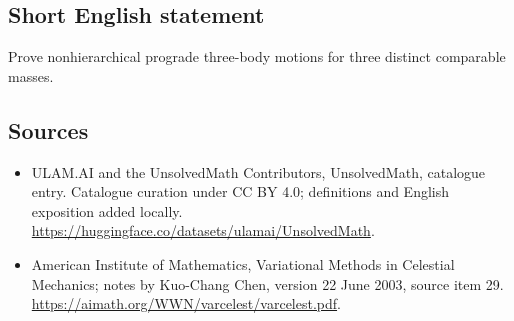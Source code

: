 \documentclass[11pt]{article}
\begin{document}
\subsection{Short English statement}
Prove nonhierarchical prograde three-body motions for three distinct comparable masses.
\subsection{Sources}
\begin{itemize}
\item[\hypertarget{source:statement:1}{S1}] ULAM.AI and the UnsolvedMath Contributors, UnsolvedMath, catalogue entry. Catalogue curation under CC BY 4.0; definitions and English exposition added locally.
\url{https://huggingface.co/datasets/ulamai/UnsolvedMath}.
\item[\hypertarget{source:statement:2}{S2}] American Institute of Mathematics, Variational Methods in Celestial Mechanics; notes by Kuo-Chang Chen, version 22 June 2003, source item 29.
\url{https://aimath.org/WWN/varcelest/varcelest.pdf}.
\end{itemize}
\label{end:statement}
\end{document}
